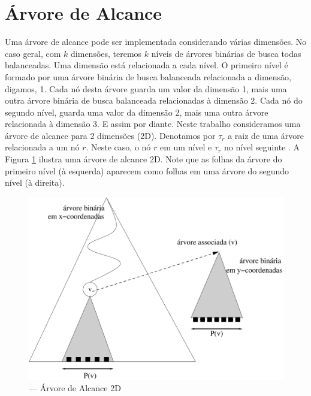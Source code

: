 


\section{Árvore de Alcance}

Uma árvore de alcance pode ser implementada considerando várias dimensões. No caso geral, com $k$ dimensões, teremos $k$ níveis de árvores binárias de busca todas balanceadas. Uma dimensão está relacionada a cada nível. O primeiro nível é formado por uma árvore binária de busca balanceada relacionada a dimensão, digamos, 1. Cada nó desta árvore guarda um valor da dimensão 1, mais uma outra árvore binária de busca balanceada relacionadas à dimensão 2. Cada nó do segundo nível, guarda uma valor da dimensão 2, mais uma outra árvore relacionada à dimensão 3. E assim por diante. Neste trabalho consideramos uma árvore de alcance para 2 dimensões (2D). Denotamos por $\tau_r$ a raiz de uma árvore relacionada a um nó $r$. Neste caso, o nó $r$ em um nível e $\tau_r$ no nível seguinte \cite{dsp_rt1}. A Figura \ref{fig:8} ilustra uma árvore de alcance 2D. Note que as folhas da árvore do primeiro nível (à esquerda) aparecem como folhas em uma árvore do segundo nível (à direita). %

\begin{figure}[htb!]
    \begin{center}
        \includegraphics[scale=0.5]{images/range_tree1.pdf}
    \end{center}
    \caption{\label{fig:Fig_26} — Árvore de Alcance 2D}
    \label{fig:8}
\end{figure}

